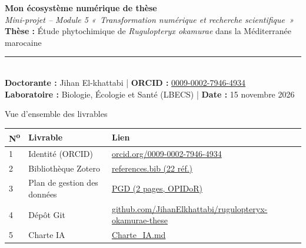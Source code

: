 \documentclass[11pt,a4paper]{article}
\begin{document}
\begin{center}
{\color{accent}\Large\bfseries Mon écosystème numérique de thèse}\\[3pt]
{\large\itshape Mini-projet -- Module 5 «~Transformation numérique et recherche scientifique~»}\\[6pt]
{\color{accent2}\textbf{Thèse :} Étude phytochimique de \textit{Rugulopteryx okamurae} dans la Méditerranée marocaine}\\[4pt]
\rule{0.97\linewidth}{0.6pt}\\[3pt]
\small
\textbf{Doctorante :} Jihan El-khattabi \quad|\quad
\textbf{ORCID :} \href{https://orcid.org/0009-0002-7946-4934}{0009-0002-7946-4934}\\
\textbf{Laboratoire :} Biologie, Écologie et Santé (LBECS) \quad|\quad
\textbf{Date :} 15 novembre 2026
\end{center}
\vspace{2pt}

\begin{lienbox}{Vue d'ensemble des livrables}
\renewcommand{\arraystretch}{1.15}
\begin{tabularx}{\linewidth}{@{}l l >{\raggedright\arraybackslash}X@{}}
\toprule
\textbf{N\textsuperscript{o}} & \textbf{Livrable} & \textbf{Lien} \\
\midrule
1 & Identité (ORCID) & \href{https://orcid.org/0009-0002-7946-4934}{orcid.org/0009-0002-7946-4934} \\
2 & Bibliothèque Zotero & \href{https://github.com/JihanElkhattabi/rugulopteryx-okamurae-these/blob/main/references.bib}{references.bib (22 réf.)} \\
3 & Plan de gestion des données & \href{https://github.com/JihanElkhattabi/rugulopteryx-okamurae-these/blob/main/docs/PGD_Rugulopteryx_okamurae.pdf}{PGD (2 pages, OPIDoR)} \\
4 & Dépôt Git & \href{https://github.com/JihanElkhattabi/rugulopteryx-okamurae-these}{github.com/JihanElkhattabi/rugulopteryx-okamurae-these} \\
5 & Charte IA & \href{https://github.com/JihanElkhattabi/rugulopteryx-okamurae-these/blob/main/Charte_IA.md}{Charte\_IA.md} \\
\bottomrule
\end{tabularx}
\end{lienbox}

\end{document}
